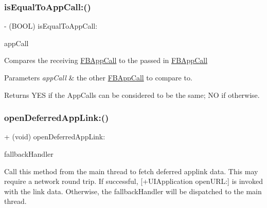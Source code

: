 \subsubsection{\texorpdfstring{is\+Equal\+To\+App\+Call\+:()}{isEqualToAppCall:()}\hspace{0.1cm}{\footnotesize\ttfamily [5/5]}}
{\footnotesize\ttfamily -\/ (B\+O\+OL) is\+Equal\+To\+App\+Call\+: \begin{DoxyParamCaption}\item[{(\hyperlink{interfaceFBAppCall}{F\+B\+App\+Call} $\ast$)}]{app\+Call }\end{DoxyParamCaption}}

Compares the receiving \hyperlink{interfaceFBAppCall}{F\+B\+App\+Call} to the passed in \hyperlink{interfaceFBAppCall}{F\+B\+App\+Call}


\begin{DoxyParams}{Parameters}
{\em app\+Call} & the other \hyperlink{interfaceFBAppCall}{F\+B\+App\+Call} to compare to.\\
\hline
\end{DoxyParams}
\begin{DoxyReturn}{Returns}
Y\+ES if the App\+Calls can be considered to be the same; NO if otherwise. 
\end{DoxyReturn}
\mbox{\label{interfaceFBAppCall_a02498c71e0be169b1ae49136d1446a23}} 
\subsubsection{\texorpdfstring{open\+Deferred\+App\+Link\+:()}{openDeferredAppLink:()}\hspace{0.1cm}{\footnotesize\ttfamily [1/5]}}
{\footnotesize\ttfamily + (void) open\+Deferred\+App\+Link\+: \begin{DoxyParamCaption}\item[{(F\+B\+App\+Link\+Fallback\+Handler)}]{fallback\+Handler }\end{DoxyParamCaption}}

Call this method from the main thread to fetch deferred applink data. This may require a network round trip. If successful, \mbox{[}+\+U\+I\+Application open\+U\+RL\+:\mbox{]} is invoked with the link data. Otherwise, the fallback\+Handler will be dispatched to the main thread.


